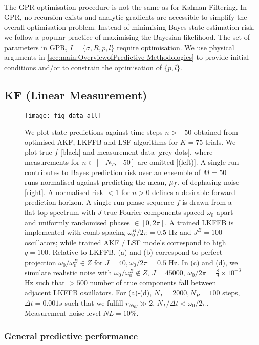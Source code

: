 \documentclass[pra, reprint]{revtex4-1}
\begin{document}
\\
\\
The GPR optimisation procedure is not the same as for Kalman Filtering. In GPR, no recursion exists and analytic gradients are accessible to simplify the overall optimisation problem. Instead of minimising Bayes state estimation risk, we follow a popular practice of maximising the Bayesian likelihood. The set of parameters in GPR, $I = \{\sigma, R, p, l \}$ require optimisation. We use physical arguments in \cref{sec:main:OverviewofPredictive Methodologies} to provide initial conditions and/or to constrain the optimisation of $\{ p, l\}$. 





\subsection{KF (Linear Measurement)}
\begin{figure}
    \texttt{[image: fig\_data\_all]}
    \caption{\label{fig:main:fig_data_all} We plot state predictions against time steps $n > -50$ obtained from optimised AKF, LKFFB and LSF algorithms for $K=75$ trials. We plot true $f$ [black] and measurement data [grey dots], where measurements for $n \in [-N_T, -50]$ are omitted [(left)]. A single run contributes to Bayes prediction risk over an ensemble of $M=50$ runs normalised against predicting the mean, $\mu_f$, of dephasing noise [right]. A normalised risk $<1$ for $n > 0$ defines a desirable forward prediction horizon. A single run phase sequence $f$ is drawn from a flat top spectrum with $J$ true Fourier components spaced $\omega_0$ apart and uniformly randomised phases $\in [0, 2\pi]$. A trained LKFFB is implemented with comb spacing $\omega_0^B / 2\pi = 0.5$ Hz and $J^B =100$ oscillators; while trained AKF / LSF models correspond to high $q = 100$. Relative to LKFFB,  (a) and (b) correspond to perfect projection $\omega_0 / \omega_0^B  \in Z $ for $J= 40, \omega_0 / 2\pi = 0.5$ Hz. In (c) and (d), we simulate realistic noise with $\omega_0 / \omega_0^B  \notin Z$, $J = 45000$, $\omega_0 / 2\pi = \frac{8}{9} \times 10^{-3}$ Hz such that $>500$ number of true components fall between adjacent LKFFB oscillators. For (a)-(d), $N_T = 2000, N_P = 100$ steps, $\Delta t = 0.001s$ such that we fulfill $r_{Nqy} \gg 2$, $N_T / \Delta t < \omega_0/2\pi$. Measurement noise level $ NL= 10\%$.}
\end{figure} 

\subsubsection{General predictive performance}
\end{document}

